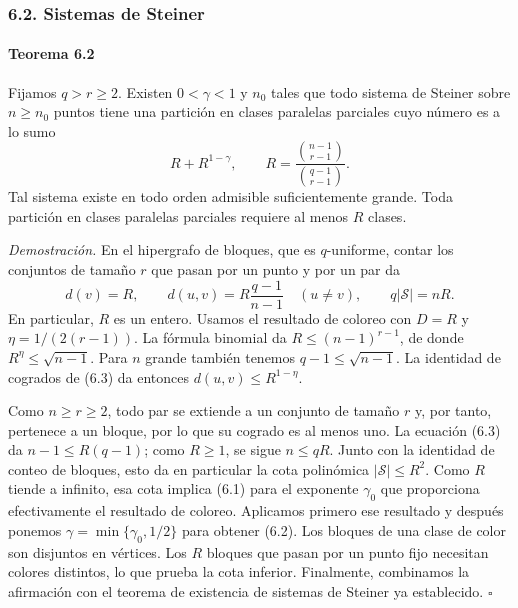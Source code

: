 \documentclass[spanish,11pt,a4paper]{article}
\begin{document}
\subsubsection{6.2. Sistemas de Steiner}\label{sistemas-de-steiner}

\par
\begin{samepage}
\paragraph{Teorema 6.2}\label{teorema-6.2}

Fijamos \(q>r\ge2\). Existen \(0<\gamma<1\) y \(n_0\) tales que todo sistema de Steiner sobre \(n\ge n_0\) puntos tiene una partición en clases paralelas parciales cuyo número es a lo sumo \[R+R^{1-\gamma},\qquad
R=\frac{\binom{n-1}{r-1}}{\binom{q-1}{r-1}}.
\tag{6.2}\] Tal sistema existe en todo orden admisible suficientemente grande. Toda partición en clases paralelas parciales requiere al menos \(R\) clases.

\end{samepage}
\emph{Demostración.} En el hipergrafo de bloques, que es \(q\)-uniforme, contar los conjuntos de tamaño \(r\) que pasan por un punto y por un par da \[d(v)=R,\qquad
d(u,v)=R\frac{q-1}{n-1}\quad(u\ne v),\qquad
q|\mathcal S|=nR.
\tag{6.3}\] En particular, \(R\) es un entero. Usamos el resultado de coloreo con \(D=R\) y \(\eta=1/(2(r-1))\). La fórmula binomial da \(R\le(n-1)^{r-1}\), de donde \(R^\eta\le\sqrt{n-1}\). Para \(n\) grande también tenemos \(q-1\le\sqrt{n-1}\). La identidad de cogrados de (6.3) da entonces \(d(u,v)\le R^{1-\eta}\).

Como \(n\ge r\ge2\), todo par se extiende a un conjunto de tamaño \(r\) y, por tanto, pertenece a un bloque, por lo que su cogrado es al menos uno. La ecuación (6.3) da \(n-1\le R(q-1)\); como \(R\ge1\), se sigue \(n\le qR\). Junto con la identidad de conteo de bloques, esto da en particular la cota polinómica \(|\mathcal S|\le R^2\). Como \(R\) tiende a infinito, esa cota implica (6.1) para el exponente \(\gamma_0\) que proporciona efectivamente el resultado de coloreo. Aplicamos primero ese resultado y después ponemos \(\gamma=\min\{\gamma_0,1/2\}\) para obtener (6.2). Los bloques de una clase de color son disjuntos en vértices. Los \(R\) bloques que pasan por un punto fijo necesitan colores distintos, lo que prueba la cota inferior. Finalmente, combinamos la afirmación con el teorema de existencia de sistemas de Steiner ya establecido. \(\square\)
\end{document}
